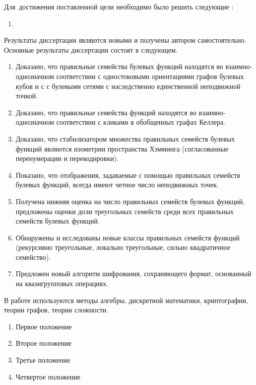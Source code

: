 Для~достижения поставленной цели необходимо было решить следующие {\tasks}:
\begin{enumerate}[beginpenalty=10000] %
  \item {}
\end{enumerate}


{\novelty}
Результаты диссертации являются новыми и получены автором самостоятельно. 
Основные результаты диссертации состоят в следующем.
\begin{enumerate}[beginpenalty=10000] %
  \item Доказано, что правильные семейства булевых функций находятся во взаимно-однозначном соответствии с одностоковыми ориентациями графов булевых кубов и с с булевыми сетями с наследственно единственной неподвижной точкой.
  \item Доказано, что правильные семейства функций находятся во взаимно-однозначном соответствии с кликами в обобщенных графах Келлера.
  \item Доказано, что стабилизатором множества правильных семейств булевых функций являются изометрии пространства Хэмминга (согласованные перенумерации и перекодировки).
  \item Показано, что отображения, задаваемые с помощью правильных семейств булевых функций, всегда имеют четное число неподвижных точек.
  \item Получена нижняя оценка на число правильных семейств булевых функций, предложены оценки доли треугольных семейств среди всех правильных семейств булевых функций.
  \item Обнаружены и исследованы новые классы правильных семейств функций (рекурсивно треугольные, локально треугольные, сильно квадратичное семейство).
  \item Предложен новый алгоритм шифрования, сохраняющего формат, основанный на квазигрупповых операциях.
\end{enumerate}


{\methods} В работе используются методы алгебры, дискретной математики, криптографии, теории графов, теории сложности.

{}
\begin{enumerate}[beginpenalty=10000] %
  \item Первое положение
  \item Второе положение
  \item Третье положение
  \item Четвертое положение
\end{enumerate}

